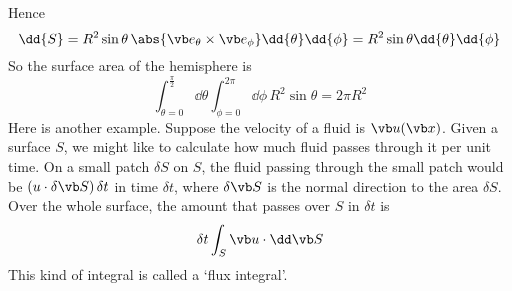 Hence
\[
	\dd{S} = R^2 \sin\theta\, \abs{\vb e_\theta \times \vb e_\phi} \dd{\theta}\dd{\phi} = R^2 \sin \theta \dd{\theta} \dd{\phi}
\]
So the surface area of the hemisphere is
\[
	\int_{\theta = 0}^{\frac{\pi}{2}} \dd{\theta} \int_{\phi = 0}^{2 \pi} \dd{\phi} \, R^2 \sin \theta = 2 \pi R^2
\]
Here is another example.
Suppose the velocity of a fluid is \(\vb u(\vb x)\).
Given a surface \(S\), we might like to calculate how much fluid passes through it per unit time.
On a small patch \(\delta S\) on \(S\), the fluid passing through the small patch would be \((u \cdot \delta \vb S)\,\delta t\) in time \(\delta t\), where \(\delta \vb S\) is the normal direction to the area \(\delta S\).
Over the whole surface, the amount that passes over \(S\) in \(\delta t\) is
\[
	\delta t \int_S \vb u \cdot \dd \vb S
\]
This kind of integral is called a `flux integral'.

